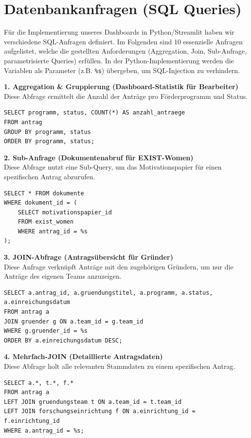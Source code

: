 \documentclass{article}
\begin{document}
\newpage
\section{Datenbankanfragen (SQL Queries)}
Für die Implementierung unseres Dashboards in Python/Streamlit haben wir verschiedene SQL-Anfragen definiert. Im Folgenden sind 10 essenzielle Anfragen aufgelistet, welche die gestellten Anforderungen (Aggregation, Join, Sub-Anfrage, parametrisierte Queries) erfüllen. In der Python-Implementierung werden die Variablen als Parameter (z.B. \texttt{\%s}) übergeben, um SQL-Injection zu verhindern.

\textbf{1. Aggregation \& Gruppierung (Dashboard-Statistik für Bearbeiter)}\\
Diese Abfrage ermittelt die Anzahl der Anträge pro Förderprogramm und Status.
\begin{verbatim}
SELECT programm, status, COUNT(*) AS anzahl_antraege
FROM antrag
GROUP BY programm, status
ORDER BY programm, status;
\end{verbatim}

\textbf{2. Sub-Anfrage (Dokumentenabruf für EXIST-Women)}\\
Diese Abfrage nutzt eine Sub-Query, um das Motivationspapier für einen spezifischen Antrag abzurufen.
\begin{verbatim}
SELECT * FROM dokumente 
WHERE dokument_id = (
    SELECT motivationspapier_id 
    FROM exist_women 
    WHERE antrag_id = %s
);
\end{verbatim}

\textbf{3. JOIN-Abfrage (Antragsübersicht für Gründer)}\\
Diese Anfrage verknüpft Anträge mit den zugehörigen Gründern, um nur die Anträge des eigenen Teams anzuzeigen.
\begin{verbatim}
SELECT a.antrag_id, a.gruendungstitel, a.programm, a.status, a.einreichungsdatum
FROM antrag a
JOIN gruender g ON a.team_id = g.team_id
WHERE g.gruender_id = %s
ORDER BY a.einreichungsdatum DESC;
\end{verbatim}

\textbf{4. Mehrfach-JOIN (Detaillierte Antragsdaten)}\\
Diese Abfrage holt alle relevanten Stammdaten zu einem spezifischen Antrag.
\begin{verbatim}
SELECT a.*, t.*, f.*
FROM antrag a
LEFT JOIN gruendungsteam t ON a.team_id = t.team_id
LEFT JOIN forschungseinrichtung f ON a.einrichtung_id = f.einrichtung_id
WHERE a.antrag_id = %s;
\end{verbatim}
\end{document}
